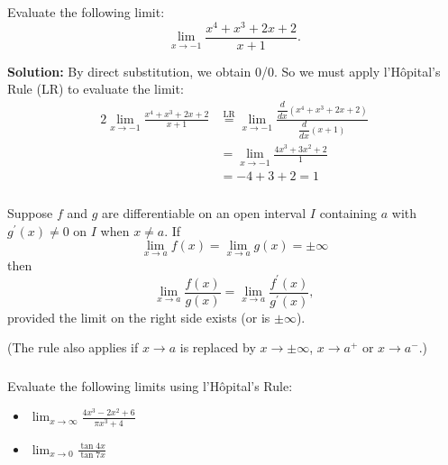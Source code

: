 \documentclass[cal1spr16Lectures.tex]{subfiles}
\begin{document}
\begin{frame}%
\frametitle{}
\small
\begin{ex} Evaluate the following limit:  
\vspace{-0.5pc}
\[\lim_{x \to -1} \frac{x^4+x^3+2x+2}{x+1}.\]
\end{ex}

\footnotesize
{\bf Solution:}  By direct substitution, we obtain 0/0.  So we must apply l'H\^{o}pital's Rule (LR) to evaluate the limit:
\begin{alignat*}{2}
\lim_{x \to -1} \frac{x^4+x^3+2x+2}{x+1} &\overset{\text{LR}}{=} \lim_{x \to -1} \frac{ \dfrac{d}{dx} \left(x^4+x^3+2x+2 \right)}{\dfrac{d}{dx} (x+1)} \\
&= \lim_{x \to -1} \frac{4x^3+3x^2+2}{1} \\
&= -4+3+2 = 1
\end{alignat*}
\end{frame}

\begin{frame}
\frametitle{}
\small
\begin{thm}
Suppose $f$ and $g$ are differentiable on an open interval $I$ containing $a$ with $g^{\prime}(x) \ne 0$ on $I$ when $x \ne a$.  If 
$$\lim_{x \to a} f(x)=\lim_{x \to a} g(x)=\pm\infty$$
then
$$\lim_{x \to a} \frac{f(x)}{g(x)}=\lim_{x \to a} \frac{f^{\prime}(x)}{g^{\prime}(x)},$$
provided the limit on the right side exists (or is $\pm \infty$).
\end{thm}

\vspace{1pc}
(The rule also applies if $x \to a$ is replaced by $x \to \pm \infty$, $x \to a^+$ or $x \to a^-$.)
\end{frame}

\begin{frame}%
\frametitle{}
\begin{exe} Evaluate the following limits using l'H\^{o}pital's Rule:

\begin{itemize}
\item $\displaystyle\lim_{x \to \infty} \frac{4x^3-2x^2+6}{\pi x^3+4}$

\vspace{1pc}
\item $\displaystyle\lim_{x \to 0} \frac{\tan 4x}{\tan 7x}$
\end{itemize}
\end{exe}
\end{frame}
\end{document}

